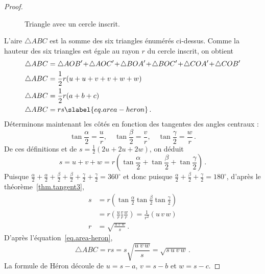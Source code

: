 \begin{proof}
\begin{figure}[ht]

\caption{Triangle avec un cercle inscrit.}\label{f.inscribed}
\end{figure}
L'aire $\triangle ABC$ est la somme des six triangles énumérés ci-dessus. Comme la hauteur des six triangles est égale au rayon $r$ du cercle inscrit, on obtient 
\begin{align}
\triangle ABC&=\triangle AOB'\!+\!\triangle AOC'\!+\!\triangle BOA'\!+\!\triangle BOC'\!+\!\triangle COA'\!+\!\triangle COB'\\
\triangle ABC&=\frac{1}{2}r(u+u+v+v+w+w)\\
\triangle ABC&=\frac{1}{2}r(a+b+c)\\
\triangle ABC&=rs \slabel{eq.area-heron}\,.
\end{align}
Déterminons maintenant les côtés en fonction des tangentes des angles centraux :
\begin{displaymath}
\tan \frac{\alpha}{2} = \frac{u}{r},\quad
\tan \frac{\beta}{2} = \frac{v}{r},\quad
\tan \frac{\gamma}{2} = \frac{w}{r}\,.
\end{displaymath}
De ces définitions et de $s=\frac{1}{2}(2u+2u+2w)$, on déduit 
\[
s = u+v+w = r\left(\tan \frac{\alpha}{2}+\tan \frac{\beta}{2}+\tan \frac{\gamma}{2}\right)\,.
\]
Puisque $\frac{\alpha}{2}+\frac{\alpha}{2}+\frac{\beta}{2}+\frac{\beta}{2}+\frac{\gamma}{2}+\frac{\gamma}{2}=360^\circ$ et donc puisque $\frac{\alpha}{2}+\frac{\beta}{2}+\frac{\gamma}{2}=180^\circ$, d'après le théorème~\ref{thm.tangent3},
\begin{align*}
s&=r\left(\tan \frac{\alpha}{2}\tan \frac{\beta}{2}\tan \frac{\gamma}{2}\right)\\
&=r\left(\frac{u}{r}\frac{v}{r}\frac{w}{r}\right)=\frac{1}{r^2}(u\,v\,w)\\
r&=\sqrt{\displaystyle\frac{u\,v\,w}{s}}\,.
\end{align*}
D'après l'équation~\ref{eq.area-heron},
\[
\triangle ABC=rs=s\sqrt{\displaystyle\frac{u\,v\,w}{s}}=\sqrt{s\,u\,v\,w}\,.
\]
La formule de Héron découle de $u=s-a$, $v=s-b$ et $w=s-c$.
\end{proof}


